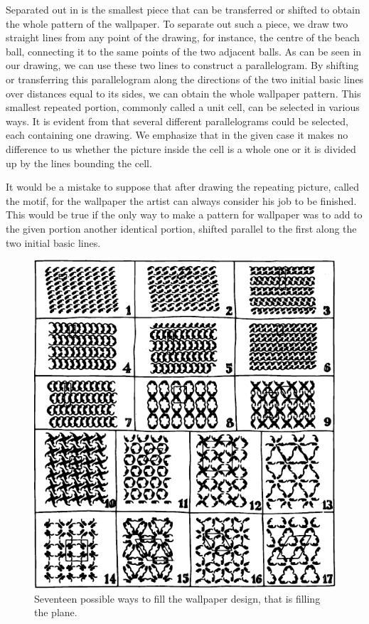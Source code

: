 Separated out in  is the smallest piece that can be transferred or shifted to obtain the whole pattern of the wallpaper. To separate out such a piece, we draw two straight lines from any point of the drawing, for instance, the centre of the beach ball, connecting it to the same points of the two adjacent balls. As can be seen in our drawing, we can use these two lines to construct a parallelogram. By shifting or transferring this parallelogram along the directions of the two initial basic lines over distances equal to its sides, we can obtain the whole wallpaper pattern. This smallest repeated portion, commonly called a unit cell, can be selected in various ways. It is evident from  that several different parallelograms could be selected, each containing one drawing. We emphasize that in the given case it makes no difference to us whether the picture inside the cell is a whole one or it is divided up by the lines bounding the cell.

It would be a mistake to suppose that after drawing the repeating picture, called the motif, for the wallpaper the artist can always consider his job to be finished. This would be true if the only way to make a pattern for wallpaper was to add to the given portion another identi­cal portion, shifted parallel to the first along the two initial basic lines.

\begin{figure}[!ht]
\centering
\includegraphics[width=\textwidth]{figures/fig-02-11.pdf}
\caption{Seventeen possible ways to fill the wallpaper design, that is filling the plane.}
\label{fig-2.11}
\end{figure}



